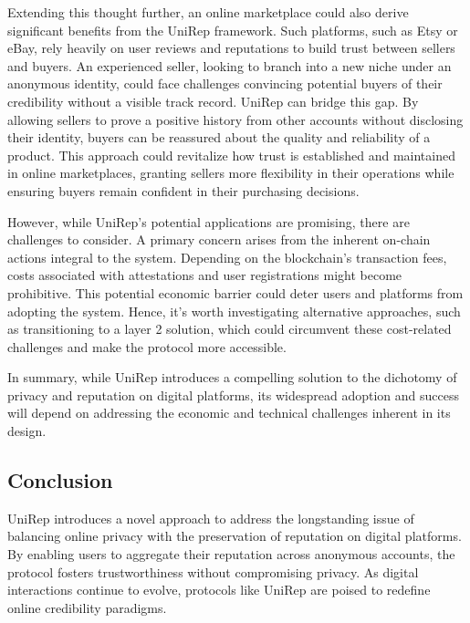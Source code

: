 \documentclass[11pt]{article}
\begin{document}
Extending this thought further, an online marketplace could also derive significant benefits from the UniRep framework. Such platforms, such as Etsy or eBay, rely heavily on user reviews and reputations to build trust between sellers and buyers. An experienced seller, looking to branch into a new niche under an anonymous identity, could face challenges convincing potential buyers of their credibility without a visible track record. UniRep can bridge this gap. By allowing sellers to prove a positive history from other accounts without disclosing their identity, buyers can be reassured about the quality and reliability of a product. This approach could revitalize how trust is established and maintained in online marketplaces, granting sellers more flexibility in their operations while ensuring buyers remain confident in their purchasing decisions.

However, while UniRep's potential applications are promising, there are challenges to consider. A primary concern arises from the inherent on-chain actions integral to the system. Depending on the blockchain's transaction fees, costs associated with attestations and user registrations might become prohibitive. This potential economic barrier could deter users and platforms from adopting the system. Hence, it's worth investigating alternative approaches, such as transitioning to a layer 2 solution, which could circumvent these cost-related challenges and make the protocol more accessible.

In summary, while UniRep introduces a compelling solution to the dichotomy of privacy and reputation on digital platforms, its widespread adoption and success will depend on addressing the economic and technical challenges inherent in its design.
\subsection{Conclusion}
\label{sec:orgaae5ffe}

UniRep introduces a novel approach to address the longstanding issue of balancing online privacy with the preservation of reputation on digital platforms. By enabling users to aggregate their reputation across anonymous accounts, the protocol fosters trustworthiness without compromising privacy. As digital interactions continue to evolve, protocols like UniRep are poised to redefine online credibility paradigms.
\end{document}
